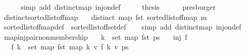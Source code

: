 \begin{isabellebody}
\ \ \ \ \isamarkupfalse%
\ {\isacharparenleft}{\kern0pt}simp\ add{\isacharcolon}{\kern0pt}\ distinct{\isacharunderscore}{\kern0pt}map\ inj{\isacharunderscore}{\kern0pt}on{\isacharunderscore}{\kern0pt}def{\isacharparenright}{\kern0pt}\isanewline
\ \ \isamarkupfalse%
\ \isamarkupfalse%
\ {\isacharquery}{\kern0pt}thesis\isanewline
\ \ \ \ \isamarkupfalse%
\ presburger\isanewline
{}\isamarkupfalse%
%
\endisatagproof
{\isafoldproof}%
%
\isadelimproof
\isanewline
%
\endisadelimproof
\isanewline
{}\isamarkupfalse%
\ distinct{\isacharunderscore}{\kern0pt}sorted{\isacharunderscore}{\kern0pt}list{\isacharunderscore}{\kern0pt}of{\isacharunderscore}{\kern0pt}fmap{\isacharcolon}{\kern0pt}\isanewline
\ \ \ {\isachardoublequoteopen}distinct\ {\isacharparenleft}{\kern0pt}map\ fst\ {\isacharparenleft}{\kern0pt}sorted{\isacharunderscore}{\kern0pt}list{\isacharunderscore}{\kern0pt}of{\isacharunderscore}{\kern0pt}fmap\ m{\isacharparenright}{\kern0pt}{\isacharparenright}{\kern0pt}{\isachardoublequoteclose}\isanewline
%
\isadelimproof
\ \ %
\endisadelimproof
%
\isatagproof
{}\isamarkupfalse%
\ sorted{\isacharunderscore}{\kern0pt}list{\isacharunderscore}{\kern0pt}of{\isacharunderscore}{\kern0pt}fmap{\isacharunderscore}{\kern0pt}def\ \ sorted{\isacharunderscore}{\kern0pt}list{\isacharunderscore}{\kern0pt}of{\isacharunderscore}{\kern0pt}fset{\isacharunderscore}{\kern0pt}def\isanewline
\ \ \isamarkupfalse%
\ {\isacharparenleft}{\kern0pt}simp\ add{\isacharcolon}{\kern0pt}\ distinct{\isacharunderscore}{\kern0pt}map\ inj{\isacharunderscore}{\kern0pt}on{\isacharunderscore}{\kern0pt}def{\isacharparenright}{\kern0pt}%
\endisatagproof
{\isafoldproof}%
%
\isadelimproof
\isanewline
%
\endisadelimproof
\isanewline
{}\isamarkupfalse%
\ map{\isacharunderscore}{\kern0pt}inj{\isacharunderscore}{\kern0pt}pair{\isacharunderscore}{\kern0pt}non{\isacharunderscore}{\kern0pt}membership{\isacharcolon}{\kern0pt}\isanewline
\ \ \ {\isachardoublequoteopen}k\ {\isasymnotin}\ set\ {\isacharparenleft}{\kern0pt}map\ fst\ ps{\isacharparenright}{\kern0pt}{\isachardoublequoteclose}\isanewline
\ \ \ {\isachardoublequoteopen}inj\ f{\isachardoublequoteclose}\isanewline
\ \ \ {\isachardoublequoteopen}f\ k\ {\isasymnotin}\ set\ {\isacharparenleft}{\kern0pt}map\ fst\ {\isacharparenleft}{\kern0pt}map\ {\isacharparenleft}{\kern0pt}{\isasymlambda}{\isacharparenleft}{\kern0pt}k{\isacharcomma}{\kern0pt}\ v{\isacharparenright}{\kern0pt}{\isachardot}{\kern0pt}\ {\isacharparenleft}{\kern0pt}f\ k{\isacharcomma}{\kern0pt}\ v{\isacharparenright}{\kern0pt}{\isacharparenright}{\kern0pt}\ ps{\isacharparenright}{\kern0pt}{\isacharparenright}{\kern0pt}{\isachardoublequoteclose}\isanewline

\end{isabellebody}
